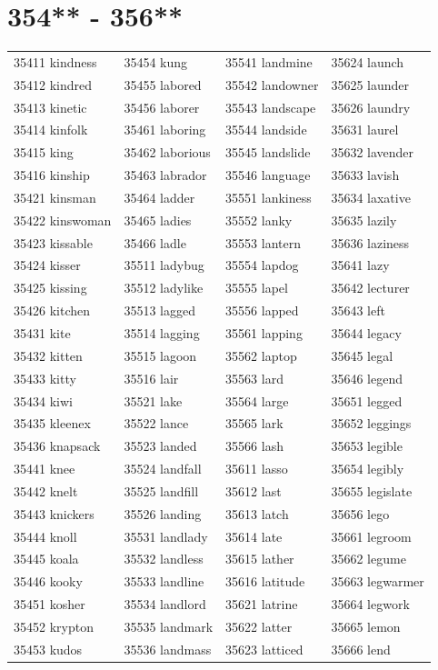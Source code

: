 \documentclass[10pt, oneside]{book}
\begin{document}
\begin{table}
	\centering
	\section*{354** - 356**}
	\begin{tabular}{l l l l}
35411 kindness &35454 kung &35541 landmine &35624 launch\\
35412 kindred &35455 labored &35542 landowner &35625 launder\\
35413 kinetic &35456 laborer &35543 landscape &35626 laundry\\
35414 kinfolk &35461 laboring &35544 landside &35631 laurel\\
35415 king &35462 laborious &35545 landslide &35632 lavender\\
35416 kinship &35463 labrador &35546 language &35633 lavish\\
35421 kinsman &35464 ladder &35551 lankiness &35634 laxative\\
35422 kinswoman &35465 ladies &35552 lanky &35635 lazily\\
35423 kissable &35466 ladle &35553 lantern &35636 laziness\\
35424 kisser &35511 ladybug &35554 lapdog &35641 lazy\\
35425 kissing &35512 ladylike &35555 lapel &35642 lecturer\\
35426 kitchen &35513 lagged &35556 lapped &35643 left\\
35431 kite &35514 lagging &35561 lapping &35644 legacy\\
35432 kitten &35515 lagoon &35562 laptop &35645 legal\\
35433 kitty &35516 lair &35563 lard &35646 legend\\
35434 kiwi &35521 lake &35564 large &35651 legged\\
35435 kleenex &35522 lance &35565 lark &35652 leggings\\
35436 knapsack &35523 landed &35566 lash &35653 legible\\
35441 knee &35524 landfall &35611 lasso &35654 legibly\\
35442 knelt &35525 landfill &35612 last &35655 legislate\\
35443 knickers &35526 landing &35613 latch &35656 lego\\
35444 knoll &35531 landlady &35614 late &35661 legroom\\
35445 koala &35532 landless &35615 lather &35662 legume\\
35446 kooky &35533 landline &35616 latitude &35663 legwarmer\\
35451 kosher &35534 landlord &35621 latrine &35664 legwork\\
35452 krypton &35535 landmark &35622 latter &35665 lemon\\
35453 kudos &35536 landmass &35623 latticed &35666 lend\\
	\end{tabular}
 \end{table}
\clearpage
\end{document}
